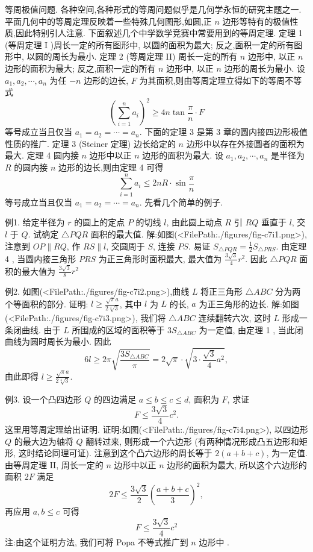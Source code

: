 
等周极值问题.
各种空间,各种形式的等周问题似乎是几何学永恒的研究主题之一.
平面几何中的等周定理反映着一些特殊几何图形,如圆,正 $n$ 边形等特有的极值性质,因此特别引人注意.
下面叙述几个中学数学竞赛中常要用到的等周定理.
定理 1 (等周定理 I )周长一定的所有图形中, 以圆的面积为最大; 反之,面积一定的所有图形中, 以圆的周长为最小.
定理 2 (等周定理 II) 周长一定的所有 $n$ 边形中, 以正 $n$ 边形的面积为最大; 反之,面积一定的所有 $n$ 边形中, 以正 $n$ 边形的周长为最小.
设 $a_1, a_2, \cdots, a_n$ 为任 $-n$ 边形的边长, $F$ 为其面积,则由等周定理立得如下的等周不等式
$$
\left(\sum_{i=1}^n a_i\right)^2 \geqslant 4 n \tan \frac{\pi}{n} \cdot F
$$
等号成立当且仅当 $a_1=a_2=\cdots=a_n$.
下面的定理 3 是第 3 章的圆内接四边形极值性质的推广.
定理 3 (Steiner 定理) 边长给定的 $n$ 边形中以存在外接圆者的面积为最大.
定理 4 圆内接 $n$ 边形中以正 $n$ 边形的面积为最大.
设 $a_1, a_2, \cdots, a_n$ 是半径为 $R$ 的圆内接 $n$ 边形的边长,则由定理 4 可得
$$
\sum_{i=1}^n a_i \leqslant 2 n R \cdot \sin \frac{\pi}{n}
$$
等号成立当且仅当 $a_1=a_2=\cdots=a_n$.
先看几个简单的例子.



例1. 给定半径为 $r$ 的圆上的定点 $P$ 的切线 $l$, 由此圆上动点 $R$ 引 $R Q$ 垂直于 $l$, 交 $l$ 于 $Q$. 试确定 $\triangle P Q R$ 面积的最大值.
解:如图(<FilePath:./figures/fig-c7i1.png>), 注意到 $O P \| R Q$, 作 $R S \| l$, 交圆周于 $S$, 连接 $P S$. 易证
$S_{\triangle P Q R}=\frac{1}{2} S_{\triangle P R S}$.
由定理 4 , 当圆内接三角形 $P R S$ 为正三角形时面积最大, 最大值为 $\frac{3 \sqrt{3}}{4} r^2$. 因此 $\triangle P Q R$ 面积的最大值为 $\frac{3 \sqrt{3}}{8} r^2$



例2. 如图(<FilePath:./figures/fig-c7i2.png>),曲线 $L$ 将正三角形 $\triangle A B C$ 分为两个等面积的部分.
证明: $l \geqslant \frac{\sqrt{\pi} a}{2 \sqrt[4]{3}}$, 其中 $l$ 为 $L$ 的长, $a$ 为正三角形的边长.
解:如图(<FilePath:./figures/fig-c7i3.png>), 我们将 $\triangle A B C$ 连续翻转六次, 这时 $L$ 形成一条闭曲线.
由于 $L$ 所围成的区域的面积等于 $3 S_{\triangle A B C}$ 为一定值, 由定理 1 , 当此闭曲线为圆时周长为最小.
因此
$$
6 l \geqslant 2 \pi \sqrt{\frac{3 S_{\triangle A B C}}{\pi}}=2 \sqrt{\pi} \cdot \sqrt{3 \cdot \frac{\sqrt{3}}{4} a^2},
$$
由此即得 $l \geqslant \frac{\sqrt{\pi} a}{2 \sqrt[4]{3}}$.



例3. 设一个凸四边形 $Q$ 的四边满足 $a \leqslant b \leqslant c \leqslant d$, 面积为 $F$, 求证
$$
F \leqslant \frac{3 \sqrt{3}}{4} c^2 .
$$
这里用等周定理给出证明.
证明:如图(<FilePath:./figures/fig-c7i4.png>), 以四边形 $Q$ 的最大边为轴将 $Q$ 翻转过来, 则形成一个六边形 (有两种情况形成凸五边形和矩形, 这时结论同理可证). 注意到这个凸六边形的周长等于 $2(a+b+c)$, 为一定值.
由等周定理 II,
周长一定的 $n$ 边形中以正 $n$ 边形的面积为最大, 所以这个六边形的面积 $2 F$ 满足
$$
2 F \leqslant \frac{3 \sqrt{3}}{2}\left(\frac{a+b+c}{3}\right)^2,
$$
再应用 $a, b \leqslant c$ 可得
$$
F \leqslant \frac{3 \sqrt{3}}{4} c^2
$$
注:由这个证明方法, 我们可将 Popa 不等式推广到 $n$ 边形中 .




